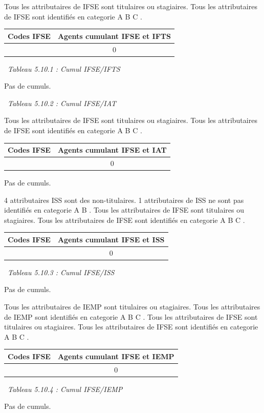 Tous les attributaires de IFSE sont titulaires ou stagiaires. Tous les
attributaires de IFSE sont identifiés en categorie A B C .

\begin{longtable}[]{@{}cc@{}}
\toprule
Codes IFSE & Agents cumulant IFSE et IFTS\tabularnewline
\midrule
\endhead
& 0\tabularnewline
\bottomrule
\end{longtable}

~\emph{Tableau 5.10.1 : Cumul IFSE/IFTS}

Pas de cumuls.

~\emph{Tableau 5.10.2 : Cumul IFSE/IAT}

Tous les attributaires de IFSE sont titulaires ou stagiaires. Tous les
attributaires de IFSE sont identifiés en categorie A B C .

\begin{longtable}[]{@{}cc@{}}
\toprule
Codes IFSE & Agents cumulant IFSE et IAT\tabularnewline
\midrule
\endhead
& 0\tabularnewline
\bottomrule
\end{longtable}

Pas de cumuls.

4 attributaires ISS sont des non-titulaires. 1 attributaires de ISS ne
sont pas identifiés en categorie A B . Tous les attributaires de IFSE
sont titulaires ou stagiaires. Tous les attributaires de IFSE sont
identifiés en categorie A B C .

\begin{longtable}[]{@{}cc@{}}
\toprule
Codes IFSE & Agents cumulant IFSE et ISS\tabularnewline
\midrule
\endhead
& 0\tabularnewline
\bottomrule
\end{longtable}

~\emph{Tableau 5.10.3 : Cumul IFSE/ISS}

Pas de cumuls.

Tous les attributaires de IEMP sont titulaires ou stagiaires. Tous les
attributaires de IEMP sont identifiés en categorie A B C . Tous les
attributaires de IFSE sont titulaires ou stagiaires. Tous les
attributaires de IFSE sont identifiés en categorie A B C .

\begin{longtable}[]{@{}cc@{}}
\toprule
Codes IFSE & Agents cumulant IFSE et IEMP\tabularnewline
\midrule
\endhead
& 0\tabularnewline
\bottomrule
\end{longtable}

~\emph{Tableau 5.10.4 : Cumul IFSE/IEMP}

Pas de cumuls.

